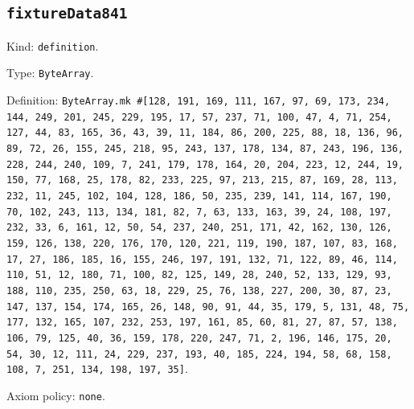 \documentclass[11pt]{article}
\begin{document}
\subsection*{\texttt{fixtureData841}}
\noindent Kind: \texttt{definition}.\par
\noindent Type: \texttt{ByteArray}.\par
\noindent Definition: \texttt{ByteArray.mk \#[128, 191, 169, 111, 167, 97, 69, 173, 234, 144, 249, 201, 245, 229, 195, 17, 57, 237, 71, 100, 47, 4, 71, 254, 127, 44, 83, 165, 36, 43, 39, 11, 184, 86, 200, 225, 88, 18, 136, 96, 89, 72, 26, 155, 245, 218, 95, 243, 137, 178, 134, 87, 243, 196, 136, 228, 244, 240, 109, 7, 241, 179, 178, 164, 20, 204, 223, 12, 244, 19, 150, 77, 168, 25, 178, 82, 233, 225, 97, 213, 215, 87, 169, 28, 113, 232, 11, 245, 102, 104, 128, 186, 50, 235, 239, 141, 114, 167, 190, 70, 102, 243, 113, 134, 181, 82, 7, 63, 133, 163, 39, 24, 108, 197, 232, 33, 6, 161, 12, 50, 54, 237, 240, 251, 171, 42, 162, 130, 126, 159, 126, 138, 220, 176, 170, 120, 221, 119, 190, 187, 107, 83, 168, 17, 27, 186, 185, 16, 155, 246, 197, 191, 132, 71, 122, 89, 46, 114, 110, 51, 12, 180, 71, 100, 82, 125, 149, 28, 240, 52, 133, 129, 93, 188, 110, 235, 250, 63, 18, 229, 25, 76, 138, 227, 200, 30, 87, 23, 147, 137, 154, 174, 165, 26, 148, 90, 91, 44, 35, 179, 5, 131, 48, 75, 177, 132, 165, 107, 232, 253, 197, 161, 85, 60, 81, 27, 87, 57, 138, 106, 79, 125, 40, 36, 159, 178, 220, 247, 71, 2, 196, 146, 175, 20, 54, 30, 12, 111, 24, 229, 237, 193, 40, 185, 224, 194, 58, 68, 158, 108, 7, 251, 134, 198, 197, 35]}.\par
\noindent Axiom policy: \texttt{none}.\par
\end{document}
